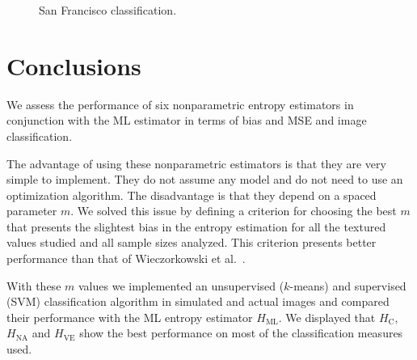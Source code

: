 \documentclass[journal]{IEEEtran}
\begin{document}
\begin{figure}[hbt]
	\caption{San Francisco classification.}
	\label{fig:class_SF}
\end{figure}    

\section{Conclusions}
\label{sec:conclusions}

We assess the performance of six nonparametric entropy estimators in conjunction with the ML estimator in terms of bias and MSE and image classification. 

The advantage of using these nonparametric estimators is that they are very simple to implement. They do not assume any model and do not need to use an optimization algorithm. The disadvantage is that they depend on a spaced parameter $m$. We solved this issue by defining a criterion for choosing the best $m$ that presents the slightest bias in the entropy estimation for all the textured values studied and all sample sizes analyzed. This criterion presents better performance than that of Wieczorkowski et al.~\cite{Wieczorkowski1999}.

With these $m$ values we implemented an unsupervised ($k$-means) and supervised (SVM) classification  algorithm in simulated and actual images and compared their performance with the ML entropy estimator $H_{\text{ML}}$. We displayed that $H_\text{C}$, $H_{\text{NA}}$ and $H_{\text{VE}}$ show the best performance on most of the classification measures used. 
\end{document}
